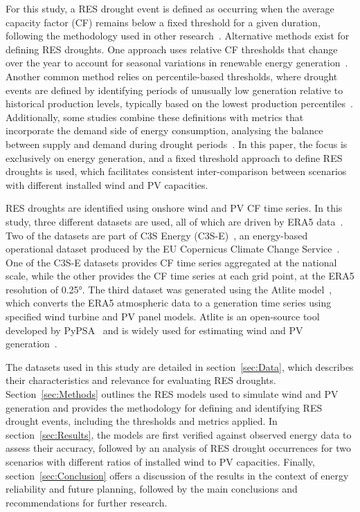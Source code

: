 \documentclass[preprint, 12pt, authoryear]{elsarticle}
\begin{document}
For this study, a RES drought event is defined as occurring when the average capacity factor (CF) remains below a fixed threshold for a given duration, following the methodology used in other research~\citep{kaspar2019drought, ohba2022drought, mockert2023drought, mayer2023drought}. Alternative methods exist for defining RES droughts. One approach uses relative CF thresholds that change over the year to account for seasonal variations in renewable energy generation~\citep{raynaud2018drought, rinaldi2021drought, gangopadhyay2022drought, allen2023drought, kapica2024drought}. Another common method relies on percentile-based thresholds, where drought events are defined by identifying periods of unusually low generation relative to historical production levels, typically based on the lowest production percentiles~\citep{bracken2024drought, allen2023drought}. Additionally, some studies combine these definitions with metrics that incorporate the demand side of energy consumption, analysing the balance between supply and demand during drought periods~\citep{raynaud2018drought, rinaldi2021drought, allen2023drought, bracken2024drought}. In this paper, the focus is exclusively on energy generation, and a fixed threshold approach to define RES droughts is used, which facilitates consistent inter-comparison between scenarios with different installed wind and PV capacities.

RES droughts are identified using onshore wind and PV CF time series. In this study, three different datasets are used, all of which are driven by ERA5 data~\citep{hersbach2020era5}. Two of the datasets are part of C3S Energy (C3S-E)~\citep{cds2023energy}, an energy-based operational dataset produced by the EU Copernicus Climate Change Service~\citep{dubus2023energy}. One of the C3S-E datasets provides CF time series aggregated at the national scale, while the other provides the CF time series at each grid point, at the ERA5 resolution of 0.25°. The third dataset was generated using the Atlite model~\citep{hofman2021atlite}, which converts the ERA5 atmospheric data to a generation time series using specified wind turbine and PV panel models. Atlite is an open-source tool developed by PyPSA~\citep{hofman2021atlite} and is widely used for estimating wind and PV generation~\citep{mockert2023drought, li2023atlite, parzen2023atlite, ali2023comparative}.

The datasets used in this study are detailed in section~\ref{sec:Data}, which describes their characteristics and relevance for evaluating RES droughts. Section~\ref{sec:Methods} outlines the RES models used to simulate wind and PV generation and provides the methodology for defining and identifying RES drought events, including the thresholds and metrics applied. In section~\ref{sec:Results}, the models are first verified against observed energy data to assess their accuracy, followed by an analysis of RES drought occurrences for two scenarios with different ratios of installed wind to PV capacities. Finally, section~\ref{sec:Conclusion} offers a discussion of the results in the context of energy reliability and future planning, followed by the main conclusions and recommendations for further research.
\end{document}
